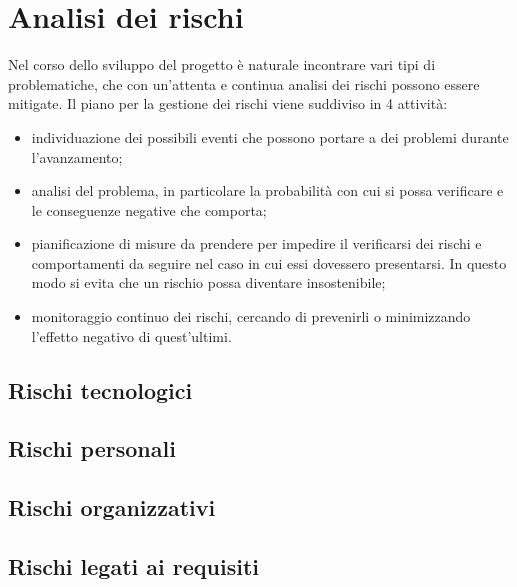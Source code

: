 \chapter{Analisi dei rischi}
Nel corso dello sviluppo del progetto è naturale incontrare vari tipi di problematiche, che con un’attenta e continua analisi dei rischi possono essere mitigate. Il piano per la gestione dei rischi viene suddiviso in 4 attività:
\begin{itemize}
    \item individuazione dei possibili eventi che possono portare a dei problemi durante l’avanzamento;
    \item analisi del problema, in particolare la probabilità con cui si possa verificare e le conseguenze
    negative che comporta;
    \item pianificazione di misure da prendere per impedire il verificarsi dei rischi e comportamenti da seguire nel caso in cui essi dovessero presentarsi. In questo modo si evita che un rischio possa diventare insostenibile;
    \item monitoraggio continuo dei rischi, cercando di prevenirli o minimizzando l’effetto negativo di quest’ultimi.
\end{itemize}

\section{Rischi tecnologici}

\section{Rischi personali}

\section{Rischi organizzativi}

\section{Rischi legati ai requisiti}
